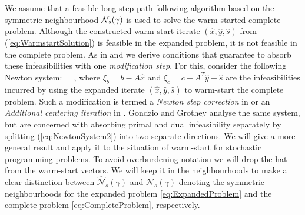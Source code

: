 We assume that a feasible long-step path-following algorithm based on
the symmetric neighbourhood $\mathcal{N}_s(\gamma)$ 
is used to solve the warm-started complete problem. 
Although the constructed warm-start iterate $(\hat{x}, \hat{y}, \hat{s})$ 
from (\ref{eq:WarmstartSolution}) is feasible in the expanded problem, 
it is not feasible in the complete problem. 
As in \cite{YildirimWright} and \cite{GondzioGrothey03} we derive
conditions that guarantee to absorb these infeasibilities with one
{\em modification step}. 
For this, consider the following Newton system:
\be \label{eq:NewtonSystem2}
 = 
\left[ \begin{array}{c}
    \xi_b \\ \xi_c \\ 0
  \end{array} \right],
\ee
where $\xi_b = b - A\hat{x}$ and $\xi_c = c - A^T\hat{y}+\hat{s}$ are the
infeasibilities incurred by using the expanded iterate $(\hat{x},
\hat{y}, \hat{s})$ to warm-start the complete problem. 
Such a modification is termed a {\em Newton step correction} in
\cite{YildirimWright} or an {\em Additional centering iteration}
in \cite{GondzioGrothey06}. 
Gondzio and Grothey \cite{GondzioGrothey03} analyse the
same system, but are concerned with absorbing primal and dual
infeasibility separately by splitting (\ref{eq:NewtonSystem2}) into
two separate directions.
We will give a more general result and apply it to the situation of
warm-start for stochastic programming problems. To avoid overburdening
notation we will drop the hat from the warm-start vectors.
We will keep it in the neighbourhoods to make a clear distinction between
$\widehat{\mathcal{N}}_s(\gamma)$ and $\mathcal{N}_s(\gamma)$
denoting the symmetric neighbourhoods 
for the expanded problem \eqref{eq:ExpandedProblem}
and the complete problem \eqref{eq:CompleteProblem}, respectively.


